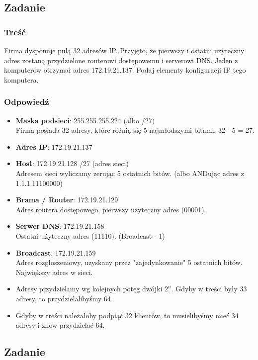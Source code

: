 	\subsection{Zadanie}
		\subsubsection{Treść}
			Firma dysponuje pulą 32 adresów IP. Przyjęto, że pierwszy i ostatni użyteczny adres zostaną przydzielone routerowi dostępowemu i serverowi DNS. Jeden z komputerów otrzymał adres 172.19.21.137. Podaj elementy konfiguracji IP tego komputera.
		\subsubsection{Odpowiedź}
			\begin{itemize}
				\item \textbf{Maska podsieci}: 255.255.255.224 (albo /27)\\
				Firma posiada 32 adresy, które różnią się 5 najmłodszymi bitami. 32 - 5 = 27.
				\item \textbf{Adres IP}: 172.19.21.137
				\item \textbf{Host}: 172.19.21.128 /27 (adres sieci)\\
				Adresem sieci wyliczamy zerując 5 ostatnich bitów. (albo ANDując adres z 1.1.1.11100000)
				\item \textbf{Brama / Router}: 172.19.21.129\\
				Adres routera dostępowego, pierwszy użyteczny adres (00001).
				\item \textbf{Serwer DNS}: 172.19.21.158\\
				Ostatni użyteczny adres (11110). (Broadcast - 1)
				\item \textbf{Broadcast}: 172.19.21.159\\
				Adres rozgłoszeniowy, uzyskany przez "zajedynkowanie" 5 ostatnich bitów. Największy adres w sieci.
				\item Adresy przydzielamy wg kolejnych potęg dwójki $ 2^n $. Gdyby w treści były 33 adresy, to przydzielalibyśmy 64.
				\item Gdyby w treści należałoby podpiąć 32 klientów, to musielibyśmy mieć 34 adresy i znów przydzielać 64.
			\end{itemize}
	\subsection{Zadanie}
